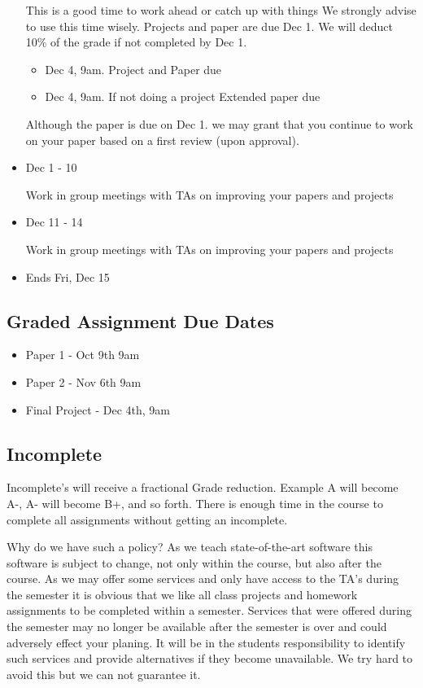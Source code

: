 \begin{itemize}
  This is a good time to work ahead or catch up with things We strongly
  advise to use this time wisely. Projects and paper are due Dec 1. We
  will deduct 10\% of the grade if not completed by Dec 1.

  \begin{itemize}
  \tightlist
  \item
    Dec 4, 9am. Project and Paper due
  \item
    Dec 4, 9am. If not doing a project Extended paper due
  \end{itemize}

  Although the paper is due on Dec 1. we may grant that you continue to
  work on your paper based on a first review (upon approval).
\item
  Dec 1 - 10

  Work in group meetings with TAs on improving your papers and projects
\item
  Dec 11 - 14

  Work in group meetings with TAs on improving your papers and projects
\item
  Ends Fri, Dec 15
\end{itemize}

\subsection{Graded Assignment Due
Dates}\label{graded-assignment-due-dates}

\begin{itemize}
\tightlist
\item
  Paper 1 - Oct 9th 9am
\item
  Paper 2 - Nov 6th 9am
\item
  Final Project - Dec 4th, 9am
\end{itemize}

\subsection{Incomplete}\label{incomplete}

Incomplete's will receive a fractional Grade reduction. Example A will
become A-, A- will become B+, and so forth. There is enough time in the
course to complete all assignments without getting an incomplete.

Why do we have such a policy? As we teach state-of-the-art software this
software is subject to change, not only within the course, but also
after the course. As we may offer some services and only have access to
the TA's during the semester it is obvious that we like all class
projects and homework assignments to be completed within a semester.
Services that were offered during the semester may no longer be
available after the semester is over and could adversely effect your
planing. It will be in the students responsibility to identify such
services and provide alternatives if they become unavailable. We try
hard to avoid this but we can not guarantee it.

